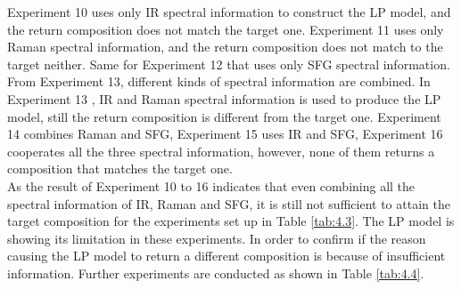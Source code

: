 Experiment 10 uses only IR spectral information to construct the LP model, and the return composition does not match the target one. Experiment 11 uses only Raman spectral information, and the return composition does not match to the target neither. Same for Experiment 12 that uses only SFG spectral information. From Experiment 13, different kinds of spectral information are combined. In Experiment 13 , IR and Raman spectral information is used to produce the LP model, still the return composition is different from the target one. Experiment 14 combines Raman and SFG, Experiment 15 uses IR and SFG, Experiment 16 cooperates all the three spectral information, however, none of them returns a composition that matches the target one. \\

As the result of Experiment 10 to 16 indicates that even combining all the spectral information of IR, Raman and SFG, it is still not sufficient to attain the target composition for the experiments set up in Table \ref{tab:4.3}. The LP model is showing its limitation in these experiments. In order to confirm if the reason causing the LP model to return a different composition is because of insufficient information. Further experiments are conducted as shown in Table \ref{tab:4.4}. \\

